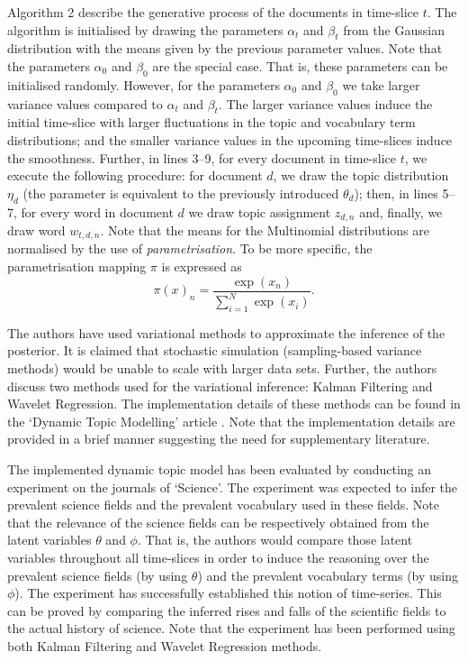 \documentclass{mprop}
\begin{document}
Algorithm 2 describe the generative process of the documents in time-slice $t$. The algorithm is initialised by drawing the parameters $\alpha_t$ and $\beta_t$ from the Gaussian distribution with the means given by the previous parameter values. Note that the parameters $\alpha_0$ and $\beta_0$ are the special case. That is, these parameters can be initialised randomly. However, for the parameters $\alpha_0$ and $\beta_0$ we take larger variance values compared to $\alpha_t$ and $\beta_t$. The larger variance values induce the initial time-slice with larger fluctuations in the topic and vocabulary term distributions; and the smaller variance values in the upcoming time-slices induce the smoothness. Further, in lines 3--9, for every document in time-slice $t$, we execute the following procedure: for document $d$, we draw the topic distribution $\eta_d$ (the parameter is equivalent to the previously introduced $\theta_d$); then, in lines 5--7, for every word in document $d$ we draw topic assignment $z_{d, n}$ and, finally, we draw word $w_{t, d, n}$. Note that the means for the Multinomial distributions are normalised by the use of \textit{parametrisation}. To be more specific, the parametrisation mapping $\pi$ is expressed as
\begin{equation}
\pi(x)_n = \dfrac{\exp{(x_n)}}{\sum^N_{i=1}\exp{(x_i)}}.
\end{equation}

\par The authors have used variational methods to approximate the inference of the posterior. It is claimed that stochastic simulation (sampling-based variance methods) would be unable to scale with larger data sets. Further, the authors discuss two methods used for the variational inference: Kalman Filtering and Wavelet Regression. The implementation details of these methods can be found in the `Dynamic Topic Modelling' article \cite{blei_2006}. Note that the implementation details are provided in a brief manner suggesting the need for supplementary literature. 

\par The implemented dynamic topic model has been evaluated by conducting an experiment on the journals of `Science'. The experiment was expected to infer the prevalent science fields and the prevalent vocabulary used in these fields. Note that the relevance of the science fields can be respectively obtained from the latent variables $\theta$ and $\phi$. That is, the authors would compare those latent variables throughout all time-slices in order to induce the reasoning over the prevalent science fields (by using $\theta$) and the prevalent vocabulary terms (by using $\phi$). The experiment has successfully established this notion of time-series. This can be proved by comparing the inferred rises and falls of the scientific fields to the actual history of science. Note that the experiment has been performed using both Kalman Filtering and Wavelet Regression methods. 
\end{document}
